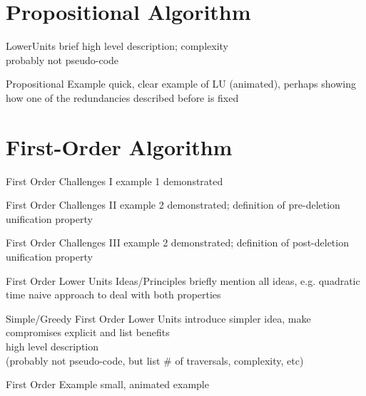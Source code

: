 \documentclass{beamer}
\begin{document}
\section{Propositional Algorithm}

\begin{frame}{LowerUnits}
brief high level description; complexity\\
probably not pseudo-code
\end{frame}

\begin{frame}{Propositional Example}
quick, clear example of LU (animated), perhaps showing how one of the redundancies described before is fixed
\end{frame}

\section{First-Order Algorithm}

\begin{frame}{First Order Challenges I}
example 1 demonstrated
\end{frame}

\begin{frame}{First Order Challenges II}
example 2 demonstrated; definition of pre-deletion unification property
\end{frame}

\begin{frame}{First Order Challenges III}
example 2 demonstrated; definition of post-deletion unification property
\end{frame}

\begin{frame}{First Order Lower Units Ideas/Principles}
briefly mention all ideas, e.g. quadratic time naive approach to deal with both properties
\end{frame}

\begin{frame}{Simple/Greedy First Order Lower Units}
introduce simpler idea, make compromises explicit and list benefits\\
high level description\\
(probably not pseudo-code, but list \# of traversals, complexity, etc)
\end{frame}

\begin{frame}{First Order Example}
small, animated example
\end{frame}
\end{document}
